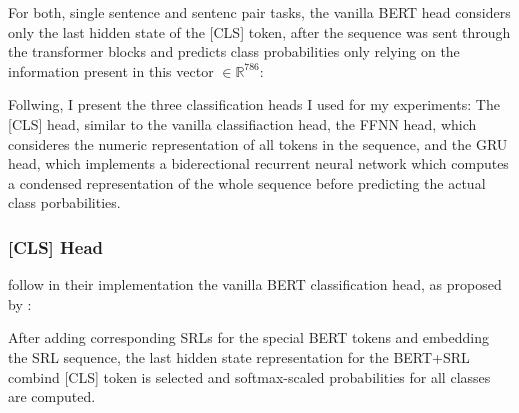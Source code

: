 


For both, single sentence and sentenc pair tasks, the vanilla BERT head considers
only the last hidden state of the [CLS] token, after the sequence was sent through
the transformer blocks and predicts class probabilities only relying on the
information present in this vector $\in \mathbb{R}^{786}$:


Follwing, I present the three classification heads I used for my experiments: The [CLS]
head, similar to the vanilla classifiaction head, the FFNN head, which consideres the
numeric representation of all tokens in the sequence, and the GRU head, which implements
a biderectional recurrent neural network which computes a condensed representation of
the whole sequence before predicting the actual class porbabilities.



\subsubsection{[CLS] Head}

\cite{zhang2019semantics} follow in their implementation the vanilla BERT classification
head, as proposed by \cite{devlin2018bert}:

After adding corresponding SRLs for the special BERT tokens and embedding the SRL sequence,
the last hidden state representation for the BERT+SRL combind [CLS] token is selected
and softmax-scaled probabilities for all classes are computed.

